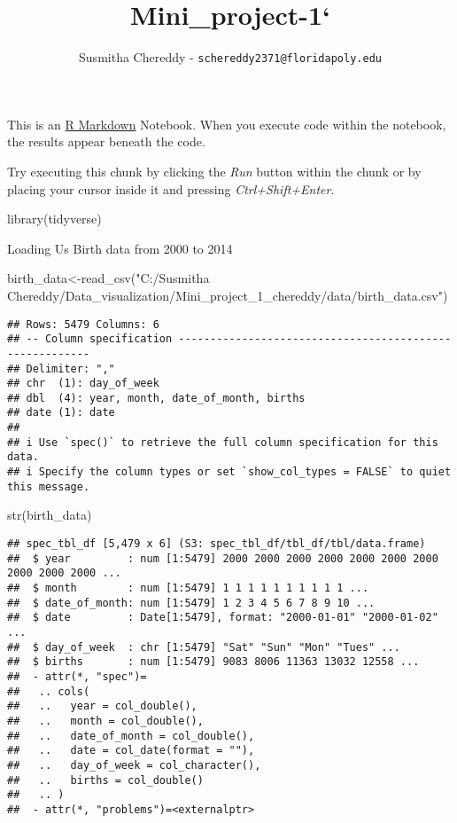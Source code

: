 \documentclass[
]{article}
\title{Mini\_project-1`}
\author{Susmitha Chereddy - \texttt{schereddy2371@floridapoly.edu}}
\date{}
\newenvironment{Shaded}{\begin{snugshade}}{\end{snugshade}}
\newcommand{\FunctionTok}[1]{\textcolor[rgb]{0.00,0.00,0.00}{#1}}
\newcommand{\NormalTok}[1]{#1}
\newcommand{\OtherTok}[1]{\textcolor[rgb]{0.56,0.35,0.01}{#1}}
\newcommand{\StringTok}[1]{\textcolor[rgb]{0.31,0.60,0.02}{#1}}
\begin{document}
\maketitle

This is an \href{http://rmarkdown.rstudio.com}{R Markdown} Notebook.
When you execute code within the notebook, the results appear beneath
the code.

Try executing this chunk by clicking the \emph{Run} button within the
chunk or by placing your cursor inside it and pressing
\emph{Ctrl+Shift+Enter}.

\begin{Shaded}
\begin{Highlighting}[]
\FunctionTok{library}\NormalTok{(tidyverse)}
\end{Highlighting}
\end{Shaded}

Loading Us Birth data from 2000 to 2014

\begin{Shaded}
\begin{Highlighting}[]
\NormalTok{birth\_data}\OtherTok{\textless{}{-}}\FunctionTok{read\_csv}\NormalTok{(}\StringTok{"C:/Susmitha Chereddy/Data\_visualization/Mini\_project\_1\_chereddy/data/birth\_data.csv"}\NormalTok{)}
\end{Highlighting}
\end{Shaded}

\begin{verbatim}
## Rows: 5479 Columns: 6
## -- Column specification --------------------------------------------------------
## Delimiter: ","
## chr  (1): day_of_week
## dbl  (4): year, month, date_of_month, births
## date (1): date
## 
## i Use `spec()` to retrieve the full column specification for this data.
## i Specify the column types or set `show_col_types = FALSE` to quiet this message.
\end{verbatim}

\begin{Shaded}
\begin{Highlighting}[]
\FunctionTok{str}\NormalTok{(birth\_data)}
\end{Highlighting}
\end{Shaded}

\begin{verbatim}
## spec_tbl_df [5,479 x 6] (S3: spec_tbl_df/tbl_df/tbl/data.frame)
##  $ year         : num [1:5479] 2000 2000 2000 2000 2000 2000 2000 2000 2000 2000 ...
##  $ month        : num [1:5479] 1 1 1 1 1 1 1 1 1 1 ...
##  $ date_of_month: num [1:5479] 1 2 3 4 5 6 7 8 9 10 ...
##  $ date         : Date[1:5479], format: "2000-01-01" "2000-01-02" ...
##  $ day_of_week  : chr [1:5479] "Sat" "Sun" "Mon" "Tues" ...
##  $ births       : num [1:5479] 9083 8006 11363 13032 12558 ...
##  - attr(*, "spec")=
##   .. cols(
##   ..   year = col_double(),
##   ..   month = col_double(),
##   ..   date_of_month = col_double(),
##   ..   date = col_date(format = ""),
##   ..   day_of_week = col_character(),
##   ..   births = col_double()
##   .. )
##  - attr(*, "problems")=<externalptr>
\end{verbatim}
\end{document}
